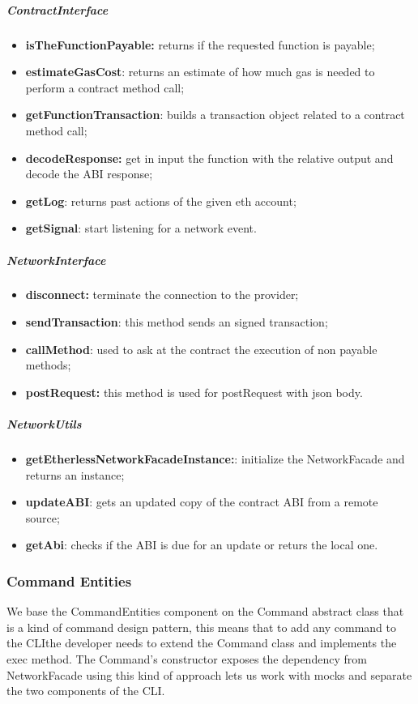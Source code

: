 \subparagraph{ContractInterface}
\begin{itemize}
	\item \textbf{isTheFunctionPayable:} returns if the requested function is payable;
	\item \textbf{estimateGasCost}: returns an estimate of how much gas is needed to perform a contract method call;
	\item \textbf{getFunctionTransaction}: builds a transaction object related to a contract method call;
	\item \textbf{decodeResponse:} get in input the function with the relative output and decode the ABI response;
    \item \textbf{getLog}: returns past actions of the given eth account;
    \item \textbf{getSignal}: start listening for a network event.
\end{itemize}
\subparagraph{NetworkInterface}
\begin{itemize}
	\item \textbf{disconnect:} terminate the connection to the provider;
    \item \textbf{sendTransaction}: this method sends an signed transaction;
    \item \textbf{callMethod}: used to ask at the contract the execution of non payable methods;
    \item \textbf{postRequest:} this method is used for postRequest with json body.
\end{itemize}
\subparagraph{NetworkUtils}
\begin{itemize}
    \item \textbf{getEtherlessNetworkFacadeInstance:}: initialize the NetworkFacade and returns an instance;
    \item \textbf{updateABI}: gets an updated copy of the contract ABI from a remote source;
    \item \textbf{getAbi}: checks if the ABI is due for an update or returs the local one.
\end{itemize}
\newpage
\subsubsection{Command Entities}
We base the CommandEntities component on the Command abstract class that is a kind of command design pattern, this means that to add any command to the CLI\glo the developer needs to extend the Command class and implements the exec method.
The Command's constructor exposes the dependency from NetworkFacade using this kind of approach lets us work with mocks and separate the two components of the CLI\glo.
